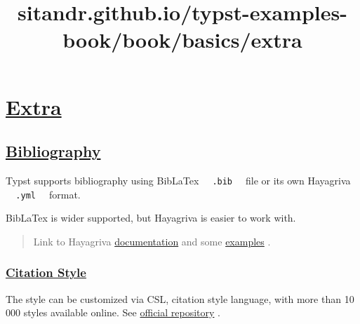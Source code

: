 \title{sitandr.github.io/typst-examples-book/book/basics/extra}

\section{\texorpdfstring{\hyperref[extra]{Extra}}{Extra}}\label{extra}

\subsection{\texorpdfstring{\hyperref[bibliography]{Bibliography}}{Bibliography}}\label{bibliography}

Typst supports bibliography using BibLaTex
\texttt{\ }{\texttt{\ .bib\ }}\texttt{\ } file or its own Hayagriva
\texttt{\ }{\texttt{\ .yml\ }}\texttt{\ } format.

BibLaTex is wider supported, but Hayagriva is easier to work with.

\begin{quote}
Link to Hayagriva
\href{https://github.com/typst/hayagriva/blob/main/docs/file-format.md}{documentation}
and some
\href{https://github.com/typst/hayagriva/blob/main/tests/data/basic.yml}{examples}
.
\end{quote}

\subsubsection{\texorpdfstring{\hyperref[citation-style]{Citation
Style}}{Citation Style}}\label{citation-style}

The style can be customized via CSL, citation style language, with more
than 10 000 styles available online. See
\href{https://github.com/citation-style-language/styles}{official
repository} .
